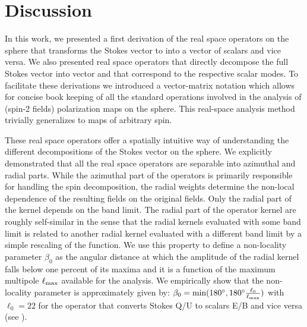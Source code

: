 \section{Discussion}\label{sec:discussion}
In this work, we presented a first derivation of the real space operators on the sphere that transforms the Stokes vector to into a vector of scalars and vice versa. We also presented real space operators that directly decompose the full Stokes vector \vp{} into vector  and  that correspond to the respective scalar modes.  To facilitate these derivations we introduced a vector-matrix notation which allows for concise book keeping of all the standard operations involved in the analysis of (spin-2 fields) polarization maps on the sphere. This real-space analysis method trivially generalizes to maps of arbitrary spin.


These real space operators offer a spatially intuitive way of understanding the different decompositions of the Stokes vector on the sphere. We explicitly  demonstrated that all the real space operators are separable into azimuthal and radial parts. While the azimuthal part of the operators is primarily responsible for handling the spin decomposition, the radial weights determine the non-local dependence of the resulting fields on the original fields.  Only the radial part of the kernel depends on the band limit. 
The radial part of the operator kernel are roughly self-similar in the sense that the radial kernels evaluated with some band limit is related to another radial kernel evaluated with a different band limit by a simple rescaling of the function. We use this property to define a non-locality parameter $\beta_0$ as the angular distance at which the amplitude of the radial kernel falls below one percent of its maxima and it  is a function of the maximum multipole $\ell_{\rm max}$ available for the analysis. We empirically show that the non-locality parameter is approximately given by: $\beta_0 = \mathrm{min}(180^{\circ}, 180^{\circ} \frac{\ell_{0}}{\ell_{\rm max}})$ with $\ell_{0}=22$ for the operator that converts Stokes Q/U to scalars E/B and vice versa (see ). 

